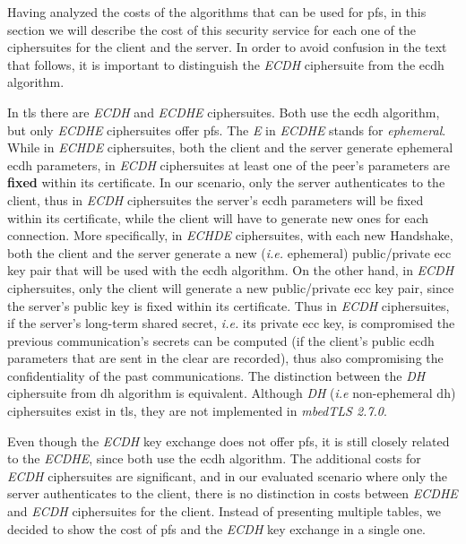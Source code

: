 \documentclass{llncs}
\begin{document}
Having analyzed the costs of the algorithms that can be used for \gls{pfs}, in this section we will describe the cost of this security service
for each one of the ciphersuites for the client and the server. In order to avoid confusion in the text that follows, it is important to
distinguish the \textit{ECDH} ciphersuite from the \gls{ecdh} algorithm.

In \gls{tls} there are \textit{ECDH} and \textit{ECDHE} ciphersuites. Both use the \gls{ecdh} algorithm, but only \textit{ECDHE} ciphersuites
offer \gls{pfs}. The \textit{E} in \textit{ECDHE} stands for \textit{ephemeral}. While in \textit{ECHDE} ciphersuites, both the client and the server
generate ephemeral \gls{ecdh} parameters, in \textit{ECDH} ciphersuites at least one of the peer's parameters are \textbf{fixed}
within its certificate. In our scenario, only the server authenticates to the client, thus in \textit{ECDH} ciphersuites the server's
\gls{ecdh} parameters will be fixed within its certificate, while the client will have to generate new ones for each connection.
More specifically, in \textit{ECHDE} ciphersuites, with each  new Handshake, both the client and the server generate a new (\textit{i.e.} ephemeral)
public/private \gls{ecc} key pair that will be used with the \gls{ecdh} algorithm. On the other hand, in \textit{ECDH} ciphersuites, only the client
will generate a new public/private \gls{ecc} key pair, since the server's public key is fixed within its certificate. Thus in \textit{ECDH}
ciphersuites, if the server's long-term shared secret, \textit{i.e.} its private \gls{ecc} key, is compromised the previous communication's secrets
can be computed (if the client's public \gls{ecdh} parameters that are sent in the clear are recorded), thus also compromising the confidentiality of
the past communications. The distinction between the \textit{DH} ciphersuite from \gls{dh} algorithm is equivalent. Although \textit{DH} (\textit{i.e}
non-ephemeral \gls{dh}) ciphersuites exist in \gls{tls}, they are not implemented in \textit{mbedTLS 2.7.0}.

Even though the \textit{ECDH} key exchange does not offer \gls{pfs}, it is still closely related to the \textit{ECDHE}, since both use
the \gls{ecdh} algorithm. The additional costs for \textit{ECDH} ciphersuites are significant, and in our evaluated scenario where only the server
authenticates to the client, there is no distinction in costs between \textit{ECDHE} and \textit{ECDH} ciphersuites for the client. Instead of
presenting multiple tables, we decided to show the cost of \gls{pfs} and the \textit{ECDH} key exchange in a single one.
\end{document}
